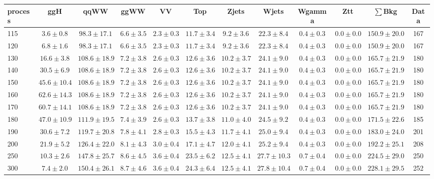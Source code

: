 \begin{table}
{\tiny
 \begin{center}
 \begin{tabular}{l c c c c c c c c c c c }
 \hline
 process & ggH & qqWW & ggWW & VV & Top & Zjets & Wjets & Wgamma & Ztt & $\sum$Bkg & Data \\
 \hline
115 & $3.6\pm0.8$ & $98.3\pm17.1$ & $6.6\pm3.5$ & $2.3\pm0.3$ & $11.7\pm3.4$ & $9.2\pm3.6$ & $22.3\pm8.4$ & $0.4\pm0.3$ & $0.0\pm0.0$ & $150.9\pm20.0$ & 167 \\
120 & $6.8\pm1.6$ & $98.3\pm17.1$ & $6.6\pm3.5$ & $2.3\pm0.3$ & $11.7\pm3.4$ & $9.2\pm3.6$ & $22.3\pm8.4$ & $0.4\pm0.3$ & $0.0\pm0.0$ & $150.9\pm20.0$ & 167 \\
130 & $16.6\pm3.8$ & $108.6\pm18.9$ & $7.2\pm3.8$ & $2.6\pm0.3$ & $12.6\pm3.6$ & $10.2\pm3.7$ & $24.1\pm9.0$ & $0.4\pm0.3$ & $0.0\pm0.0$ & $165.7\pm21.9$ & 180 \\
140 & $30.5\pm6.9$ & $108.6\pm18.9$ & $7.2\pm3.8$ & $2.6\pm0.3$ & $12.6\pm3.6$ & $10.2\pm3.7$ & $24.1\pm9.0$ & $0.4\pm0.3$ & $0.0\pm0.0$ & $165.7\pm21.9$ & 180 \\
150 & $45.6\pm10.4$ & $108.6\pm18.9$ & $7.2\pm3.8$ & $2.6\pm0.3$ & $12.6\pm3.6$ & $10.2\pm3.7$ & $24.1\pm9.0$ & $0.4\pm0.3$ & $0.0\pm0.0$ & $165.7\pm21.9$ & 180 \\
160 & $62.6\pm14.3$ & $108.6\pm18.9$ & $7.2\pm3.8$ & $2.6\pm0.3$ & $12.6\pm3.6$ & $10.2\pm3.7$ & $24.1\pm9.0$ & $0.4\pm0.3$ & $0.0\pm0.0$ & $165.7\pm21.9$ & 180 \\
170 & $60.7\pm14.1$ & $108.6\pm18.9$ & $7.2\pm3.8$ & $2.6\pm0.3$ & $12.6\pm3.6$ & $10.2\pm3.7$ & $24.1\pm9.0$ & $0.4\pm0.3$ & $0.0\pm0.0$ & $165.7\pm21.9$ & 180 \\
180 & $47.0\pm10.9$ & $111.9\pm19.5$ & $7.4\pm3.9$ & $2.6\pm0.3$ & $13.7\pm3.8$ & $11.0\pm4.0$ & $24.5\pm9.2$ & $0.4\pm0.3$ & $0.0\pm0.0$ & $171.5\pm22.6$ & 185 \\
190 & $30.6\pm7.2$ & $119.7\pm20.8$ & $7.8\pm4.1$ & $2.8\pm0.3$ & $15.5\pm4.3$ & $11.7\pm4.1$ & $25.0\pm9.4$ & $0.4\pm0.3$ & $0.0\pm0.0$ & $183.0\pm24.0$ & 201 \\
200 & $21.9\pm5.2$ & $126.4\pm22.0$ & $8.1\pm4.3$ & $3.0\pm0.4$ & $17.1\pm4.7$ & $12.0\pm4.1$ & $25.2\pm9.4$ & $0.4\pm0.3$ & $0.0\pm0.0$ & $192.2\pm25.1$ & 208 \\
250 & $10.3\pm2.6$ & $147.8\pm25.7$ & $8.6\pm4.5$ & $3.6\pm0.4$ & $23.5\pm6.2$ & $12.5\pm4.1$ & $27.7\pm10.3$ & $0.7\pm0.4$ & $0.0\pm0.0$ & $224.5\pm29.0$ & 250 \\
300 & $7.4\pm2.0$ & $150.4\pm26.1$ & $8.7\pm4.6$ & $3.6\pm0.4$ & $24.3\pm6.4$ & $12.5\pm4.1$ & $27.8\pm10.4$ & $0.7\pm0.4$ & $0.0\pm0.0$ & $228.1\pm29.5$ & 252 \\

\end{tabular}
\end{center}}
\end{table}
